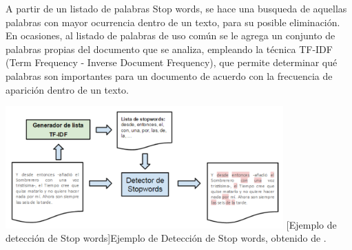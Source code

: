 \begin{enumerate}
A partir de un listado de palabras Stop words, se hace una busqueda de aquellas palabras con mayor ocurrencia dentro de un texto, para su posible eliminación. En ocasiones, al listado de palabras de uso común se le agrega un conjunto de palabras propias del documento que se analiza, empleando la técnica TF-IDF (Term Frequency - Inverse Document Frequency), que permite determinar qué palabras son importantes para un documento de acuerdo con la frecuencia de aparición dentro de un texto.
\begin{center}
    \includegraphics[width=0.8\textwidth]{Images/Cap 2/Deteccion_Stopwords.png}
    [Ejemplo de detección de Stop words]{Ejemplo de Detección de Stop words, obtenido de \cite{ref47}.}  %
\end{center}


\end{enumerate}
